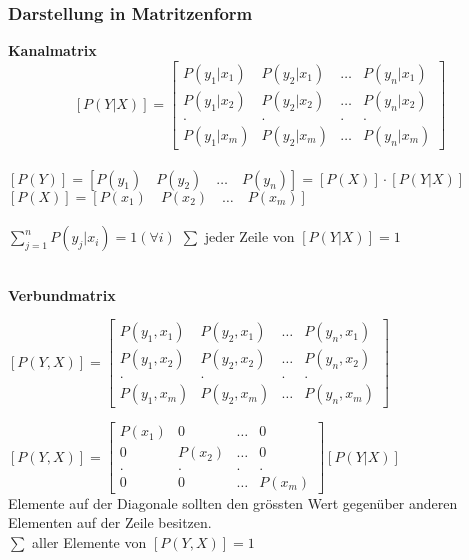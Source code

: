 \subsubsection{Darstellung in Matritzenform}
\begin{minipage}{9cm}
	\textbf{Kanalmatrix}
	$$ \boxed{[P(Y | X)] = \begin{bmatrix}
              P(y_1 | x_1) & P(y_2 | x_1) & \ldots & P(y_n | x_1) \\
              P(y_1 | x_2) & P(y_2 | x_2) & \ldots & P(y_n | x_2) \\
             . & . & . & . \\
              P(y_1 | x_m) & P(y_2 | x_m) & \ldots & P(y_n | x_m)
           \end{bmatrix}}$$ \\
	$ [P(Y)] = [P(y_1) \quad P(y_2) \quad \ldots \quad P(y_n)] = [P(X)] \cdot [P(Y|X)]$ \\
	$ [P(X)] = [P(x_1) \quad P(x_2) \quad \ldots \quad P(x_m)]$ \\ \\
	$\sum\limits_{j=1}^n P(y_j | x_i) = 1 (\forall i)$ \qquad $\sum$ jeder Zeile von $[P(Y|X)]=1$\\ \\
\end{minipage}
\begin{minipage}{9cm}
	\textbf{Verbundmatrix}
	\begin{center}$ \boxed{[P(Y,X)] = \begin{bmatrix}
              P(y_1, x_1) & P(y_2, x_1) & \ldots & P(y_n, x_1) \\
              P(y_1, x_2) & P(y_2, x_2) & \ldots & P(y_n, x_2) \\
             . & . & . & . \\
              P(y_1, x_m) & P(y_2, x_m) & \ldots & P(y_n, x_m)
           \end{bmatrix}}$
	\end{center}
	$  [P(Y,X)] =  \begin{bmatrix}
    	P(x_1) & 0 & \ldots & 0 \\
    	0 & P(x_2) & \ldots & 0 \\
    	. & . & . & . \\
    	0 & 0 & \ldots & P(x_m)
    \end{bmatrix} [P(Y|X)] $\\ 
	Elemente auf der Diagonale sollten den grössten Wert gegenüber anderen Elementen auf der Zeile
	besitzen. \\
	$\sum $ aller Elemente von $[P(Y,X)] = 1$
\end{minipage}

